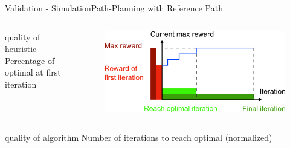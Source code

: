 \begin{frame}{Validation - Simulation}{Path-Planning with Reference Path}

\begin{columns}

\begin{minipage}{\textwidth}
\begin{block}{quality of heuristic}
{\small 
\textcolor{metric-OFI}{Percentage of optimal at first iteration}
}
\end{block}
\end{minipage}

\begin{figure}
\includegraphics[width=\textwidth]{./figure/metric2}
\end{figure}

\end{columns}

\begin{columns}


\begin{center}
\begin{minipage}{0.43\textwidth}
\begin{block}{quality of algorithm}
{\small 
\textcolor{metric-IRO}{Number of iterations to reach optimal (normalized)}
}
\end{block}
\end{minipage}
\end{center}

\end{columns}

\end{frame}


